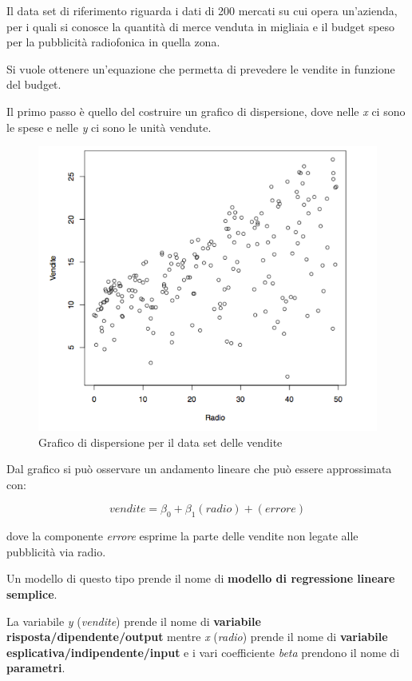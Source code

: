 Il data set di riferimento riguarda i dati di 200 mercati su cui opera
un'azienda, per i quali si conosce la quantità di merce venduta in
migliaia e il budget speso per la pubblicità radiofonica in quella
zona.

Si vuole ottenere un'equazione che permetta di prevedere le vendite in
funzione del budget.

Il primo passo è quello del costruire un grafico di dispersione, dove
nelle \emph{x} ci sono le spese e nelle \emph{y} ci sono le unità
vendute.

\begin{figure}[htbp]
\centering
\includegraphics{./notes/immagini/l3-figura1.png}
\caption{Grafico di dispersione per il data set delle vendite}
\end{figure}

Dal grafico si può osservare un andamento lineare che può essere
approssimata con:

$$
vendite = \beta_0 + \beta_1 (radio) + (errore)
$$

dove la componente \emph{errore} esprime la parte delle vendite non
legate alle pubblicità via radio.

Un modello di questo tipo prende il nome di \textbf{modello di
regressione lineare semplice}.

La variabile \emph{y} (\emph{vendite}) prende il nome di
\textbf{variabile risposta/dipendente/output} mentre \emph{x}
(\emph{radio}) prende il nome di \textbf{variabile
esplicativa/indipendente/input} e i vari coefficiente \emph{beta}
prendono il nome di \textbf{parametri}.

